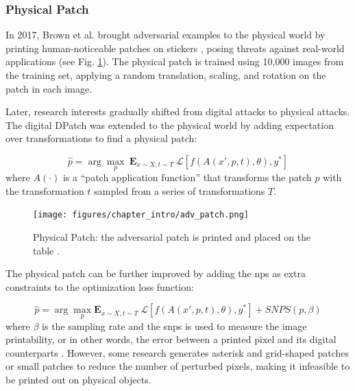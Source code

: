 



\subsubsection{Physical Patch}

In 2017, Brown et al. brought adversarial examples to the physical world by printing human-noticeable patches on stickers \citep{brown2017adversarial}, posing threats against real-world applications (see Fig. \ref{fig.physical_patch}). The physical patch is trained using 10,000 images from the training set, applying a random translation, scaling, and rotation on the patch in each image.

Later, research interests gradually shifted from digital attacks to physical attacks. The digital DPatch \citep{liu2018dpatch} was extended to the physical world \citep{lee2019physical} by adding expectation over transformations to find a physical patch:

\begin{equation}
\hat{p} = \arg \underset{p}{\max}\ \mathbf{E}_{x \sim X, t \sim T}\ \mathcal{L}[f(A(x', p, t), \theta), y^*]
\end{equation}
where $A(\cdot)$ is a “patch application function” that transforms the patch
$p$ with the transformation $t$ sampled from a series of transformations $T$.

\begin{figure}[H]
\centering
\texttt{[image: figures/chapter\_intro/adv\_patch.png]}
\caption{Physical Patch: the adversarial patch is printed and placed on the table \citep{brown2017adversarial}.}
\label{fig.physical_patch}
\end{figure}

The physical patch can be further improved by adding the \acrfull{nps} as extra constraints to the optimization loss function:

\begin{equation}
\hat{p} = \arg \underset{p}{\max}\mathbf{E}_{x \sim X, t \sim T}\ \mathcal{L}[f(A(x', p, t), \theta), y^*] + SNPS(p, \beta)
\end{equation}
where $\beta$ is the sampling rate and the \acrfull{snps} is used to measure the image printability, or in other words, the error between a printed pixel and its digital counterparts \citep{wang2021daedalus}. However, some research generates asterisk and grid-shaped patches \citep{wu2020dpattack} or small patches \citep{huang2021rpattack} to reduce the number of perturbed pixels, making it infeasible to be printed out on physical objects.

